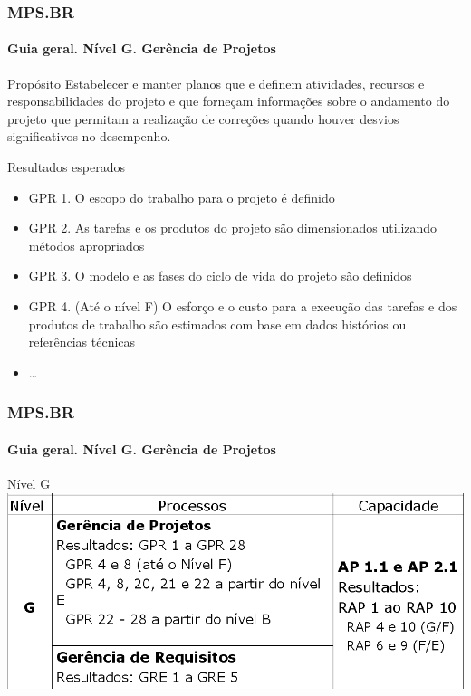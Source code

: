 \begin{frame}
	\frametitle{MPS.BR}
	\framesubtitle{Guia geral. Nível G. Gerência de Projetos}
	
	\begin{block:concept}{Propósito}
		Estabelecer e manter planos que e definem atividades, recursos e
		responsabilidades do projeto e que forneçam informações sobre o 
		andamento do projeto que permitam a realização de correções quando houver
		desvios significativos no desempenho. 
	\end{block:concept}

	\begin{block:fact}{Resultados esperados}
		\small
		\begin{itemize}
			\item GPR 1. O escopo do trabalho para o projeto é definido
			\item GPR 2. As tarefas e os produtos do projeto são dimensionados
			utilizando métodos apropriados
			\item GPR 3. O modelo e as fases do ciclo de vida do projeto são
			definidos
			\item GPR 4. (Até o nível F) O esforço e o custo para a execução das
			tarefas e dos produtos de trabalho são estimados com base em dados
			histórios ou referências técnicas
			\item \ldots
		\end{itemize}
	\end{block:fact}
\end{frame}



\begin{frame}
	\frametitle{MPS.BR}
	\framesubtitle{Guia geral. Nível G. Gerência de Projetos}
	
	\begin{block:fact}{Nível G}
		\centering
		\includegraphics[width=\textwidth]{software-engineering/project-management/process/process-quality/mpsbr/mpsbr-level-g}
	\end{block:fact}
\end{frame}



